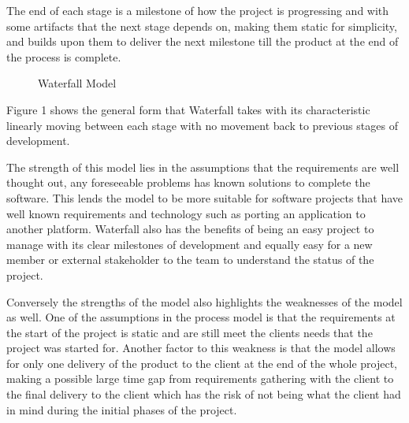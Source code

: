 \documentclass{style/CRPITStyle}
\begin{document}
The end of each stage is a milestone of how the project is progressing and with some artifacts
that the next stage depends on, making them static for simplicity, and builds upon
them to deliver the next milestone till the product at the end of the process is
complete.

\begin{figure}[htb]
\caption{\protect\label{xyz}  Waterfall Model}
\end{figure}

Figure 1 shows the general form that Waterfall takes with its characteristic 
linearly moving between each stage with no movement back to previous stages of
development.

\vspace{.1in}

The strength of this model lies in the assumptions that the requirements are
well thought out, any foreseeable problems has known solutions to complete the
software.
This lends the model to be more suitable for software projects that have well known
requirements and technology such as porting an application to another platform.
Waterfall also has the benefits of being an easy project to manage with its
clear milestones of development and equally easy for a new member or external
stakeholder to the team to understand the status of the project.

\vspace{.1in}

Conversely the strengths of the model also highlights the weaknesses of the model as
well.
One of the assumptions in the process model is that the requirements at the start of the project is
static and are still meet the clients needs that the project was started for.
Another factor to this weakness is that the model allows for only one delivery of the product to
the client at the end of the whole project, making a possible large time gap from requirements 
gathering with the client to the final delivery to the client which has the risk of not being 
what the client had in mind during the initial phases of the project.
\end{document}

